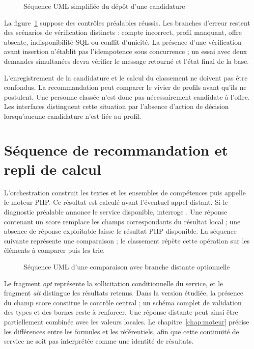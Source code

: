 \begin{figure}[H]\centering
\resizebox{\textwidth}{!}{}
\caption{Séquence UML simplifiée du dépôt d'une candidature}
\label{fig:uml-seq-candidature}\end{figure}

La figure~\ref{fig:uml-seq-candidature} suppose des contrôles préalables réussis. Les branches d'erreur restent des scénarios de vérification distincts : compte incorrect, profil manquant, offre absente, indisponibilité SQL ou conflit d'unicité. La présence d'une vérification avant insertion n'établit pas l'idempotence sous concurrence ; un essai avec deux demandes simultanées devra vérifier le message retourné et l'état final de la base.

L'enregistrement de la candidature et le calcul du classement ne doivent pas être confondus. La recommandation peut comparer le vivier de profils avant qu'ils ne postulent. Une personne classée n'est donc pas nécessairement candidate à l'offre. Les interfaces distinguent cette situation par l'absence d'action de décision lorsqu'aucune candidature n'est liée au profil.

\section{Séquence de recommandation et repli de calcul}
L'orchestration construit les textes et les ensembles de compétences puis appelle le moteur PHP. Ce résultat est calculé avant l'éventuel appel distant. Si le diagnostic préalable annonce le service disponible,  interroge . Une réponse contenant un score remplace les champs correspondants du résultat local ; une absence de réponse exploitable laisse le résultat PHP disponible. La séquence suivante représente une comparaison ; le classement répète cette opération sur les éléments à comparer puis les trie.

\begin{figure}[H]\centering
\resizebox{\textwidth}{!}{}
\caption{Séquence UML d'une comparaison avec branche distante optionnelle}
\label{fig:uml-seq-match}\end{figure}

Le fragment \emph{opt} représente la sollicitation conditionnelle du service, et le fragment \emph{alt} distingue les résultats retenus. Dans la version étudiée, la présence du champ score constitue le contrôle central ; un schéma complet de validation des types et des bornes reste à renforcer. Une réponse distante peut ainsi être partiellement combinée avec les valeurs locales. Le chapitre~\ref{chap:moteur} précise les différences entre les formules et les référentiels, afin que cette continuité de service ne soit pas interprétée comme une identité de résultats.

